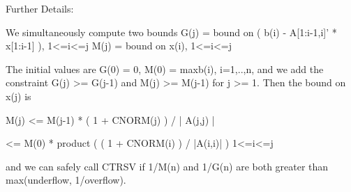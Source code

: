 \begin{DoxyParagraph}{Further Details\+: }
\begin{DoxyVerb}
  We simultaneously compute two bounds
       G(j) = bound on ( b(i) - A[1:i-1,i]' * x[1:i-1] ), 1<=i<=j
       M(j) = bound on x(i), 1<=i<=j

  The initial values are G(0) = 0, M(0) = max{b(i), i=1,..,n}, and we
  add the constraint G(j) >= G(j-1) and M(j) >= M(j-1) for j >= 1.
  Then the bound on x(j) is

       M(j) <= M(j-1) * ( 1 + CNORM(j) ) / | A(j,j) |

            <= M(0) * product ( ( 1 + CNORM(i) ) / |A(i,i)| )
                      1<=i<=j

  and we can safely call CTRSV if 1/M(n) and 1/G(n) are both greater
  than max(underflow, 1/overflow).\end{DoxyVerb}
 
\end{DoxyParagraph}
